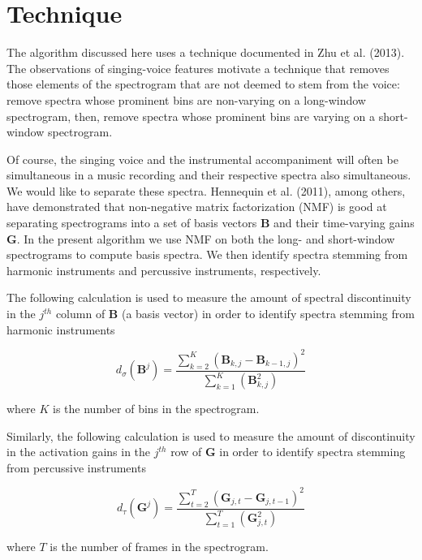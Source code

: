 \documentclass[10pt]{article}
\begin{document}
\section*{Technique}
The algorithm discussed here uses a technique documented in Zhu et al. (2013).
The observations of singing-voice features motivate a technique that removes
those elements of the spectrogram that are not deemed to stem from the voice:
remove spectra whose prominent bins are non-varying on a long-window
spectrogram, then, remove spectra whose prominent bins are varying on a
short-window spectrogram.
\par
Of course, the singing voice and the instrumental accompaniment will often be
simultaneous in a music recording and their respective spectra also simultaneous.
We would like to separate these spectra. Hennequin et al. (2011), among others,
have demonstrated that non-negative
matrix factorization (NMF) is good at separating spectrograms into a set of basis
vectors \( \mathbf{B} \) and their time-varying gains \( \mathbf{G} \).
In the present algorithm we use NMF on both the long- and short-window
spectrograms to compute basis spectra. We then identify spectra stemming from
harmonic instruments and percussive instruments, respectively.
\par
The following calculation is used to measure the amount of spectral
discontinuity in the \( j^{th} \) column of \( \mathbf{B} \) (a basis vector) in
order to identify spectra stemming from harmonic instruments

\begin{equation} \label{eq:discontinuityfreq}
d_\sigma(\mathbf{B}^j) =
\frac{\sum\limits_{k=2}^{K}(\mathbf{B}_{k,j}-\mathbf{B}_{k-1,j})^2}{
    \sum\limits_{k=1}^{K}(\mathbf{B}_{k,j}^{2})}
\end{equation}

\noindent
where \( K \) is the number of bins in the spectrogram.
\par
\newpage
Similarly, the following calculation is used to measure the amount of
discontinuity in the activation gains in the \( j^{th} \) row of \(
\mathbf{G} \) in order to identify spectra stemming from percussive instruments

\begin{equation} \label{eq:discontinuitygain}
d_\tau(\mathbf{G}^j) =
\frac{\sum\limits_{t=2}^{T}(\mathbf{G}_{j,t}-\mathbf{G}_{j,t-1})^2}{
    \sum\limits_{t=1}^{T}(\mathbf{G}_{j,t}^{2})}
\end{equation}

\noindent
where \( T \) is the number of frames in the spectrogram.
\par
\end{document}

